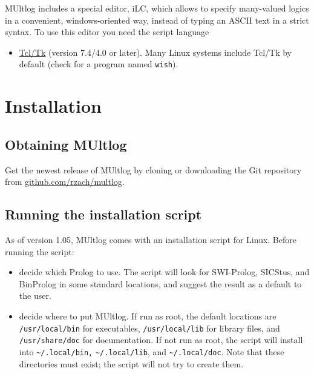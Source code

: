 \documentclass[]{article}
\providecommand{\tightlist}{%
  \setlength{\itemsep}{0pt}\setlength{\parskip}{0pt}}
\begin{document}
MUltlog includes a special editor, iLC, which allows to specify
many-valued logics in a convenient, windows-oriented way, instead of
typing an ASCII text in a strict syntax. To use this editor you need the
script language

\begin{itemize}
\tightlist
\item
  \href{https://www.tcl.tk/}{Tcl/Tk} (version 7.4/4.0 or later). Many
  Linux systems include Tcl/Tk by default (check for a program named
  \texttt{wish}).
\end{itemize}

\hypertarget{installation}{%
\section{Installation}\label{installation}}

\hypertarget{obtaining-multlog}{%
\subsection{Obtaining MUltlog}\label{obtaining-multlog}}

Get the newest release of MUltlog by cloning or downloading the Git
repository from
\href{https://github.com/rzach/multlog}{github.com/rzach/multlog}.

\hypertarget{running-the-installation-script}{%
\subsection{Running the installation
script}\label{running-the-installation-script}}

As of version 1.05, MUltlog comes with an installation script for Linux.
Before running the script:

\begin{itemize}
\item
  decide which Prolog to use. The script will look for SWI-Prolog,
  SICStus, and BinProlog in some standard locations, and suggest the
  result as a default to the user.
\item
  decide where to put MUltlog. If run as root, the default locations are
  \texttt{/usr/local/bin} for executables, \texttt{/usr/local/lib} for
  library files, and \texttt{/usr/share/doc} for documentation. If not
  run as root, the script will install into
  \texttt{\textasciitilde{}/.local/bin,}
  \texttt{\textasciitilde{}/.local/lib}, and
  \texttt{\textasciitilde{}/.local/doc}. Note that these directories
  must exist; the script will not try to create them.
\end{itemize}
\end{document}
